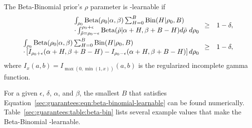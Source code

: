 The Beta-Binomial prior's $\rho$ parameter is \bed-learnable if
\begin{eqnarray}
\begin{array}{l}
\int_{\rho_0} \dBeta(\rho_0|\alpha,\beta)
 \sum_{H=0}^B \dBin(H|\rho_0,B)\\
 \cdot
  \int_{\tilde\rho=\rho_0-\epsilon}^{\rho_0+\epsilon} \dBeta(\tilde\rho|\alpha+H,\beta+B-H)
   d\tilde\rho \
  d\rho_0
  \end{array}
&\geq& 1-\delta,\\
%
\label{sec:guarantees:eqn:beta-binomial-learnable}
\begin{array}{l}
\int_{\rho_0} \dBeta(\rho_0|\alpha,\beta)
 \sum_{H=0}^B \dBin(H|\rho_0,B)\\
  \cdot \left[
   I_{\rho_0+\epsilon}(\alpha+H,\beta+B-H)
   -I_{\rho_0-\epsilon}(\alpha+H,\beta+B-H)
  \right]
  d\rho_0
\end{array}
&\geq& 1-\delta,
\end{eqnarray}
where $I_x(a,b)=I_{\max(0, \min(1, x))}(a,b)$ is the regularized incomplete gamma function.

For a given $\epsilon$, $\delta$, $\alpha$, and $\beta$, the smallest $B$ that satisfies Equation~\ref{sec:guarantees:eqn:beta-binomial-learnable} can be found numerically. Table~\ref{sec:guarantees:table:beta-bin} lists several example values that make the Beta-Binomial \bed-learnable.


\begin{table}
\caption{Learnability of a Beta-Binomial. Using the model from Section~\ref{sec:guarantees:beta-bin}, the posterior for the latent variable $\rho$ is $\epsilon$-accurate with probability at least $1-\delta$ if $B$ is above some threshold. This table gives examples of the relations between the model hyperparameters, $\epsilon$, $\delta$, and $B$. These values are a bit suspect, just wrote the code to find them. }
\label{sec:guarantees:table:beta-bin}
\\
\end{table}